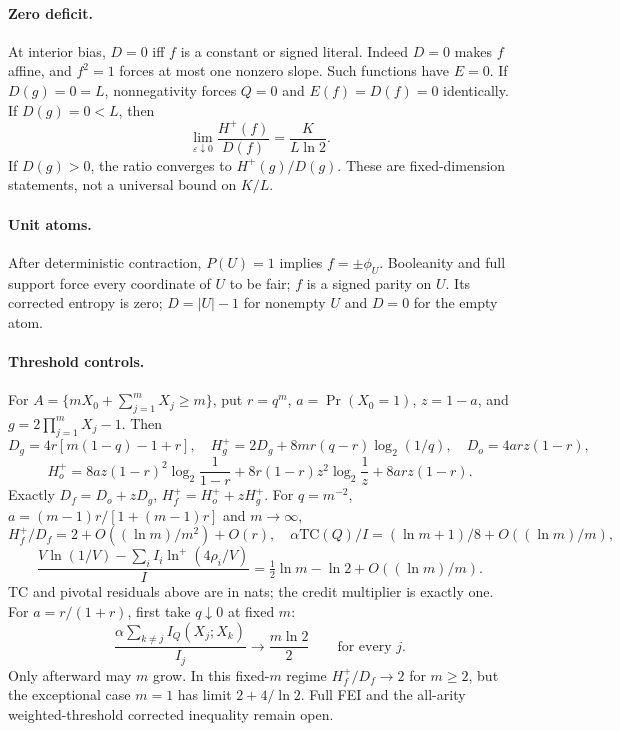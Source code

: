 \documentclass{article}
\begin{document}
\paragraph{Zero deficit.}
At interior bias, $D=0$ iff $f$ is a constant or signed literal.
Indeed $D=0$ makes $f$ affine, and $f^2=1$ forces at most one
nonzero slope. Such functions have $E=0$.
If $D(g)=0=L$, nonnegativity forces $Q=0$ and $E(f)=D(f)=0$
identically. If $D(g)=0<L$, then
\[
 \lim_{\varepsilon\downarrow0}\frac{H^+(f)}{D(f)}
       =\frac K{L\ln2}.
\]
If $D(g)>0$, the ratio converges to $H^+(g)/D(g)$.
These are fixed-dimension statements, not a universal bound on $K/L$.

\paragraph{Unit atoms.}
After deterministic contraction, $P(U)=1$ implies $f=\pm\phi_U$.
Booleanity and full support force every coordinate of $U$ to be fair;
$f$ is a signed parity on $U$. Its corrected entropy is zero;
$D=|U|-1$ for nonempty $U$ and $D=0$ for the empty atom.

\paragraph{Threshold controls.}
For $A=\{mX_0+\sum_{j=1}^mX_j\ge m\}$, put $r=q^m$,
$a=\Pr(X_0=1)$, $z=1-a$, and $g=2\prod_{j=1}^mX_j-1$.
Then
\[
 D_g=4r[m(1-q)-1+r],\quad
 H_g^+=2D_g+8mr(q-r)\log_2(1/q),\quad
 D_o=4ar z(1-r),
\]
\[
 H_o^+=8az(1-r)^2\log_2\frac1{1-r}
      +8r(1-r)z^2\log_2\frac1z+8ar z(1-r).
\]
Exactly $D_f=D_o+zD_g$, $H_f^+=H_o^++zH_g^+$.
For $q=m^{-2}$, $a=(m-1)r/[1+(m-1)r]$ and $m\to\infty$,
\[
 H_f^+/D_f=2+O((\ln m)/m^2)+O(r),\quad
 \alpha\mathrm{TC}(Q)/I=(\ln m+1)/8+O((\ln m)/m),
\]
\[
 \frac{V\ln(1/V)-\sum_i I_i\ln^+(4\rho_i/V)}I
       =\tfrac12\ln m-\ln2+O((\ln m)/m).
\]
TC and pivotal residuals above are in nats; the credit multiplier is
exactly one. For $a=r/(1+r)$, first take $q\downarrow0$ at fixed $m$:
\[
 \frac{\alpha\sum_{k\ne j}I_Q(X_j;X_k)}{I_j}
       \longrightarrow\frac{m\ln2}{2}\qquad\text{for every }j.
\]
Only afterward may $m$ grow. In this fixed-$m$ regime $H_f^+/D_f\to2$
for $m\ge2$, but the exceptional case $m=1$ has limit $2+4/\ln2$.
Full FEI and the all-arity weighted-threshold corrected inequality remain open.
\end{document}
